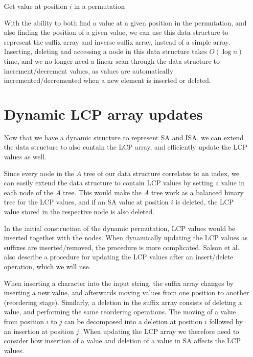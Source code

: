 \begin{algorithm}[t]
  \SetAlgoLined\DontPrintSemicolon

  \vspace{0.5cm}
  \caption{Get value at position $i$ in a permutation}
  \label{alg:dynamicpermutationaccess}
\end{algorithm}

With the ability to both find a value at a given position in the permutation, and also
finding the position of a given value, we can use this data structure to represent the
suffix array and inverse suffix array, instead of a simple array. Inserting, deleting and
accessing a node in this data structure takes $O(\log n)$ time, and we no longer need a
linear scan through the data structure to increment/decrement values, as values are
automatically incremented/decremented when a new element is inserted or deleted.

\section{Dynamic LCP array updates}

Now that we have a dynamic structure to represent SA and ISA, we can extend the data
structure to also contain the LCP array, and efficiently update the LCP values as well.

Since every node in the $A$ tree of our data structure correlates to an index, we can
easily extend the data structure to contain LCP values by setting a value in each node of
the $A$ tree. This would make the $A$ tree work as a balanced binary tree for the LCP
values, and if an SA value at position $i$ is deleted, the LCP value stored in
the respective node is also deleted.

In the initial construction of the dynamic permutation, LCP values would be inserted
together with the nodes. When dynamically updating the LCP values as suffixes are
inserted/removed, the procedure is more complicated. Salson et
al.\cite{DynamicExtendedSuffixArrays} also describe a procedure for updating the LCP
values after an insert/delete operation, which we will use.

When inserting a character into the input string, the suffix array changes by inserting a
new value, and afterwards moving values from one position to another (reordering stage).
Similarly, a deletion in the suffix array consists of deleting a value, and performing the
same reordering operations. The moving of a value from position $i$ to $j$ can be
decomposed into a deletion at position $i$ followed by an insertion at position $j$. When
updating the LCP array we therefore need to consider how insertion of a value and deletion
of a value in SA affects the LCP values.

